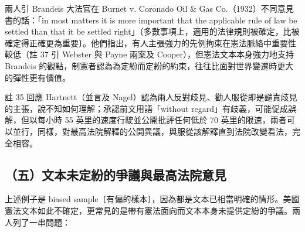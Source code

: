 兩人引 Brandeis 大法官在 Burnet v. Coronado Oil \& Gas Co.（1932）不同意見書的話：「in most matters it is more important that the applicable rule of law be settled than that it be settled right」〔多數事項上，適用的法律規則被確定，比被確定得正確更為重要〕。他們指出，有人主張強力的先例拘束在憲法脈絡中重要性較低（註 37 引 Webster 與 Payne 兩案及 Cooper），但憲法文本本身強力地支持 Brandeis 的觀點，制憲者認為為定紛而定紛的約束，往往比面對世界變遷時更大的彈性更有價值。

註 35 回應 Hartnett（並言及 Nagel）認為兩人反對歧見、勸人服從即是譴責歧見的主張，說不知如何理解；承認前文用語「without regard」有歧義，可能促成誤解，但以每小時 55 英里的速度行駛並公開批評任何低於 70 英里的限速，兩者可以並行，同樣，對最高法院解釋的公開異議，與服從該解釋直到法院改變看法，完全相容。

\subsection{（五）文本未定紛的爭議與最高法院意見}

上述例子是 biased sample〔有偏的樣本〕，因為都是文本已相當明確的情形。美國憲法文本如此不確定，更常見的是帶有憲法面向而文本本身未提供定紛的爭議。兩人列了一串問題：

